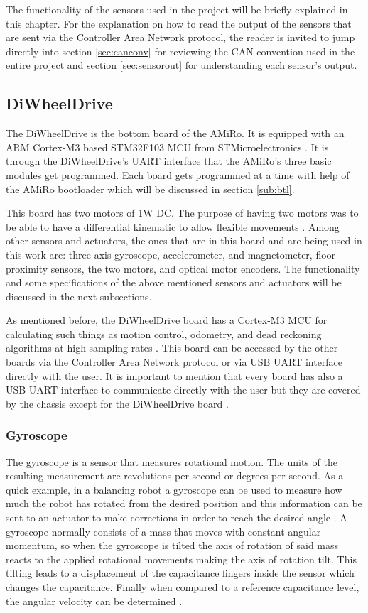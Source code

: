\documentclass[12pt]{report}%
\begin{document}
The functionality of the sensors used in the project will be briefly explained in this chapter. For the explanation on how to read the output of the sensors that are sent via the Controller Area Network protocol, the reader is invited to jump directly into section \ref{sec:canconv} for reviewing the CAN convention used in the entire project and section \ref{sec:sensorout} for understanding each sensor's output.

\subsection{DiWheelDrive}
\label{sub:DWD}
The DiWheelDrive is the bottom board of the AMiRo. It is equipped with an ARM Cortex-M3 based STM32F103 MCU from STMicroelectronics \cite{AMiRo_paper_modular}. It is through the DiWheelDrive's UART interface that the AMiRo's three basic modules get programmed. Each board gets programmed at a time with help of the AMiRo bootloader which will be discussed in section \ref{sub:btl}.

This board has two motors of 1W DC. The purpose of having two motors was to be able to have a differential kinematic to allow flexible movements \cite{AMiRo_paper_modular}. Among other sensors and actuators, the ones that are in this board and are being used in this work are: three axis gyroscope, accelerometer, and magnetometer, floor proximity sensors, the two motors, and optical motor encoders. The functionality and some specifications of the above mentioned sensors and actuators will be discussed in the next subsections.

As mentioned before, the DiWheelDrive board has a Cortex-M3 MCU for calculating such things as motion control, odometry, and dead reckoning algorithms at high sampling rates \cite{AMiRo_paper_modular}. This board can be accessed by the other boards via the Controller Area Network protocol or via USB UART interface directly with the user. It is important to mention that every board has also a USB UART interface to communicate directly with the user but they are covered by the chassis except for the DiWheelDrive board \cite{AMiRo_paper_modular}.

\subsubsection{Gyroscope}
The gyroscope is a sensor that measures rotational motion. The units of the resulting measurement are revolutions per second or degrees per second. As a quick example, in a balancing robot a gyroscope can be used to measure how much the robot has rotated from the desired position and this information can be sent to an actuator to make corrections in order to reach the desired angle \cite{gyrostheory}. A gyroscope normally consists of a mass that moves with constant angular momentum, so when the gyroscope is tilted the axis of rotation of said mass reacts to the applied rotational movements making the axis of rotation tilt. This tilting leads to a displacement of the capacitance fingers inside the sensor which changes the capacitance. Finally when compared to a reference capacitance level, the angular velocity can be determined \cite{AMiRo_ppt_v1}.
\end{document}
